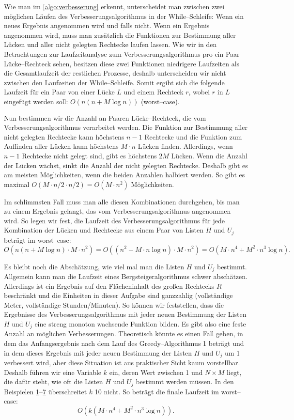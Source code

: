 Wie man im \cref{algo:verbesserung} erkennt, unterscheidet man zwischen zwei möglichen
Läufen des Verbesserungsalgorithmus in der While--Schleife:
Wenn ein neues Ergebnis angenommen wird und falls nicht.
Wenn ein Ergebnis angenommen wird, muss man zusätzlich die Funktionen zur Bestimmung aller Lücken und aller nicht gelegten
Rechtecke laufen lassen.
Wie wir in den Betrachtungen zur Laufzeitanalyse zum Verbesserungsalgorithmus pro ein Paar Lücke--Rechteck 
sehen, besitzen diese zwei Funktionen niedrigere
Laufzeiten als die Gesamtlaufzeit der restlichen Prozesse, deshalb unterscheiden wir
nicht zwischen den Laufzeiten der While--Schleife.
Somit ergibt sich die folgende Laufzeit für ein Paar von einer Lücke $L$ und einem Rechteck $r$,
wobei $r$ in $L$ eingefügt werden soll: $O(n(n + M \log n))$ (worst--case).

Nun bestimmen wir die Anzahl an Paaren Lücke--Rechteck, die vom Verbesserungsalgorithmus
verarbeitet werden. Die Funktion zur Bestimmung aller nicht gelegten Rechtecke kann
höchstens $n-1$ Rechtecke und die Funktion zum Auffinden aller Lücken kann 
höchstens $M \cdot n$ Lücken finden.
Allerdings, wenn $n-1$ Rechtecke nicht gelegt sind, gibt es höchstens $2M$ Lücken.
Wenn die Anzahl der Lücken wächst, sinkt die Anzahl der nicht gelegten Rechtecke.
Deshalb gibt es am meisten Möglichkeiten, wenn die beiden Anzahlen halbiert werden.
So gibt es maximal $O(M \cdot n/2 \cdot n/2) = O(M \cdot n^2)$ Möglichkeiten.

Im schlimmsten Fall muss man alle diesen Kombinationen durchgehen, bis man
zu einem Ergebnis gelangt, das vom Verbesserungsalgorithmus angenommen wird.
So legen wir fest, die Laufzeit des Verbesserungsalgorithmus
für jede Kombination der Lücken und Rechtecke aus einem Paar von Listen $H$ und $U_j$
beträgt im worst--case:
\[
	O(n(n + M \log n) \cdot M \cdot n^2) = O((n^2 + M \cdot n \log n) \cdot M \cdot n^2)
	= O(M \cdot n^4 + M^2 \cdot n^3 \log n).
\]

Es bleibt noch die Abschätzung, wie viel mal man die Listen $H$ und $U_j$ bestimmt.
Allgemein kann man die Laufzeit eines Bergsteigeralgorithmus schwer abschätzen.
Allerdings ist ein Ergebnis auf den Flächeninhalt des großen Rechtecks $R$ beschränkt
und die Einheiten in dieser Aufgabe sind ganzzahlig (vollständige Meter, vollständige Stunden/Minuten).
So können wir feststellen, dass die Ergebnisse des Verbesserungsalgorithmus mit jeder
neuen Bestimmung der Listen $H$ und $U_j$ eine streng monoton wachsende Funktion bilden.
Es gibt also eine feste Anzahl an möglichen Verbesserungen.
Theoretisch könnte es einen Fall geben, in dem das Anfangsergebnis nach dem Lauf
des Greedy--Algorithmus 1 beträgt und in dem dieses Ergebnis mit jeder 
neuen Bestimmung der Listen $H$ und $U_j$ um 1 verbessert wird,
aber diese Situation ist aus praktischer Sicht kaum vorstellbar. 
Deshalb führen wir eine Variable $k$ ein, deren Wert zwischen 1 und $N \times M$ liegt, die
dafür steht, wie oft die Listen $H$ und $U_j$ bestimmt werden müssen.
In den Beispielen \hyperref[ex:1]{1}--\hyperref[ex:7]{7} überschreitet $k$ 10 nicht.
So beträgt die finale Laufzeit im worst--case:
\[
	O(k(M \cdot n^4 + M^2 \cdot n^3 \log n)).
\]
